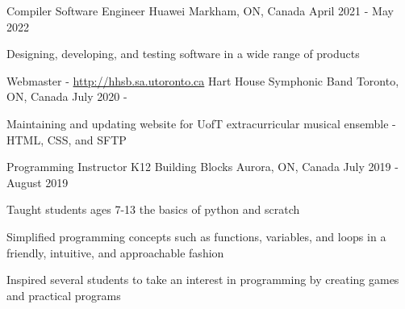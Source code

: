 

\begin{cventries}

  \cventry
  {Compiler Software Engineer}
  {Huawei}
  {Markham, ON, Canada}
  {April 2021 - May 2022}
  {
    \begin{cvitems}
      \item {Designing, developing, and testing software in a wide range of products }
    \end{cvitems}
  }

  \cventry
  {Webmaster - \url{http://hhsb.sa.utoronto.ca}} %
  {Hart House Symphonic Band} %
  {Toronto, ON, Canada} %
  {July 2020 - } %
  {
    \begin{cvitems} %
      \item {Maintaining and updating website for UofT extracurricular musical ensemble - HTML, CSS, and SFTP}
    \end{cvitems}
  }

  \cventry
  {Programming Instructor} %
  {K12 Building Blocks} %
  {Aurora, ON, Canada} %
  {July 2019 - August 2019} %
  {
    \begin{cvitems} %
      \item {Taught students ages 7-13 the basics of python and scratch}
      \item { Simplified programming concepts such as functions, variables, and loops in a friendly, intuitive, and approachable fashion}
      \item {Inspired several students to take an interest in programming by creating games and practical programs}
    \end{cvitems}
  }

\end{cventries}